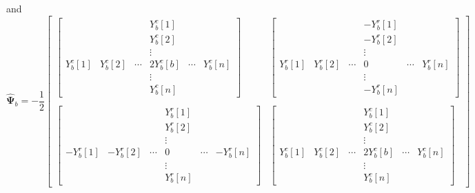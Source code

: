 \documentclass{article}
\begin{document}
and
\[
    \mathbf{\hat{\Psi}}_b =
    -\frac{1}{2}\begin{bmatrix}
        \begin{bmatrix}
            & & & Y_b^c[1] & \\
            & & & Y_b^c[2] & \\
            & & & \vdots & \\
            Y_b^c[1] & Y_b^c[2] & \cdots & 2 Y_b^c[b] & \cdots & Y_b^c[n]\\
            & & & \vdots & \\
            & & & Y_b^c[n] &
        \end{bmatrix} &
        \begin{bmatrix}
            & & & - Y_b^r[1] & \\
            & & & - Y_b^r[2] & \\
            & & & \vdots & \\
            Y_b^r[1] & Y_b^r[2] & \cdots & 0 & \cdots & Y_b^r[n]\\
            & & & \vdots & \\
            & & & - Y_b^r[n] &
        \end{bmatrix} \\ \\
        \begin{bmatrix}
            & & & Y_b^r[1] & \\
            & & & Y_b^r[2] & \\
            & & & \vdots & \\
            -Y_b^r[1] & -Y_b^r[2] & \cdots & 0 & \cdots & -Y_b^r[n]\\
            & & & \vdots & \\
            & & & Y_b^r[n] &
        \end{bmatrix} &
        \begin{bmatrix}
            & & & Y_b^c[1] & \\
            & & & Y_b^c[2] & \\
            & & & \vdots & \\
            Y_b^c[1] & Y_b^c[2] & \cdots & 2 Y_b^c[b] & \cdots & Y_b^c[n]\\
            & & & \vdots & \\
            & & & Y_b^c[n] &
        \end{bmatrix}
    \end{bmatrix}
\]
\end{document}
